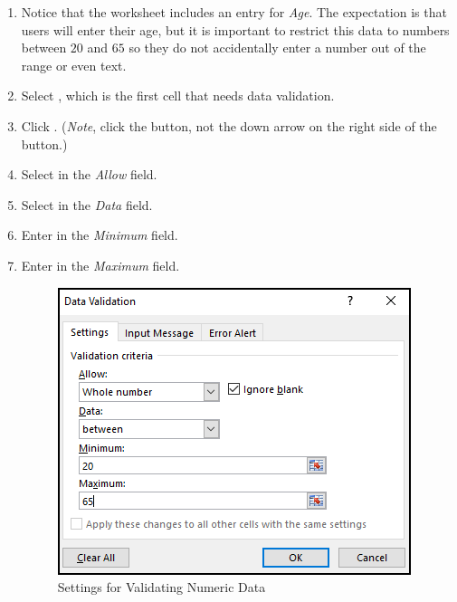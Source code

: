 \begin{enumbox}
	\begin{enumerate}
		\item Notice that the  worksheet includes an entry for \textit{Age}. The expectation is that users will enter their age, but it is important to restrict this data to numbers between $ 20 $ and $ 65 $ so they do not accidentally enter a number out of the range or even text.
		\item Select , which is the first cell that needs data validation. 
		\item Click . (\textit{Note}, click the button, not the down arrow on the right side of the button.)
		\item Select  in the \textit{Allow} field.
		\item Select  in the \textit{Data} field.
		\item Enter  in the \textit{Minimum} field.
		\item Enter  in the \textit{Maximum} field.

		\begin{figure}[H]
			\centering
			\includegraphics[width=\maxwidth{.75\linewidth}]{gfx/ch07_fig39}
			\caption{Settings for Validating Numeric Data}
			\label{07:fig39}
		\end{figure}


\end{enumerate}
\end{enumbox}
